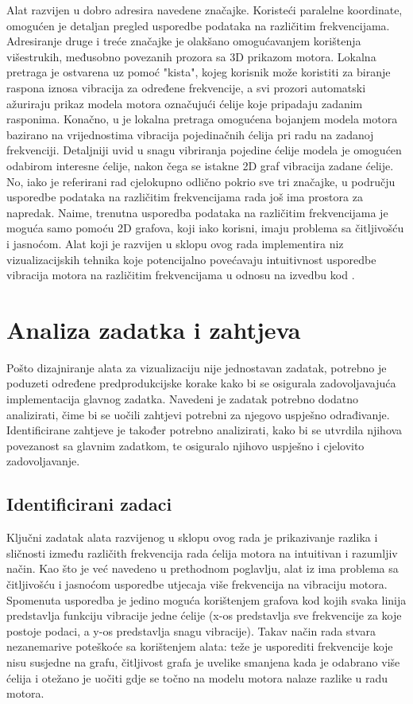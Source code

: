 \documentclass[times, utf8, diplomski]{fer}
\begin{document}
Alat razvijen u \citep{matkovic2021getting} dobro adresira navedene značajke. Koristeći paralelne koordinate, omogućen je detaljan pregled usporedbe podataka na različitim frekvencijama. Adresiranje druge i treće značajke je olakšano omogućavanjem korištenja višestrukih, međusobno povezanih prozora sa 3D prikazom motora. Lokalna pretraga je ostvarena uz pomoć "kista", kojeg korisnik može koristiti za biranje raspona iznosa vibracija za određene frekvencije, a svi prozori automatski ažuriraju prikaz modela motora označujući ćelije koje pripadaju zadanim rasponima. Konačno, u \citep{matkovic2021getting} je lokalna pretraga omogućena bojanjem modela motora bazirano na vrijednostima vibracija pojedinačnih ćelija pri radu na zadanoj frekvenciji. Detaljniji uvid u snagu vibriranja pojedine ćelije modela je omogućen odabirom interesne ćelije, nakon čega se istakne 2D graf vibracija  zadane ćelije.\\

No, iako je referirani rad cjelokupno odlično pokrio sve tri značajke, u području usporedbe podataka na različitim frekvencijama rada još ima prostora za napredak. Naime, trenutna usporedba podataka na različitim frekvencijama je moguća samo pomoću 2D grafova, koji iako korisni, imaju problema sa čitljivošću i jasnoćom. Alat koji je razvijen u sklopu ovog rada implementira niz vizualizacijskih tehnika koje potencijalno povećavaju intuitivnost usporedbe vibracija motora na različitim frekvencijama u odnosu na izvedbu kod \citep{matkovic2021getting}.

\chapter{Analiza zadatka i zahtjeva}
Pošto dizajniranje alata za vizualizaciju nije jednostavan zadatak, potrebno je poduzeti određene predprodukcijske korake kako bi se osigurala zadovoljavajuća implementacija glavnog zadatka. Navedeni je zadatak potrebno dodatno analizirati, čime bi se uočili zahtjevi potrebni za njegovo uspješno odrađivanje. Identificirane zahtjeve je također potrebno analizirati, kako bi se utvrdila njihova povezanost sa glavnim zadatkom, te osiguralo njihovo uspješno i cjelovito zadovoljavanje. 

\section{Identificirani zadaci}
Ključni zadatak alata razvijenog u sklopu ovog rada je prikazivanje razlika i sličnosti između različith frekvencija rada ćelija motora na intuitivan i razumljiv način. Kao što je već navedeno u prethodnom poglavlju, alat iz \citep{matkovic2021getting} ima problema sa čitljivošću i jasnoćom usporedbe utjecaja više frekvencija na vibraciju motora. Spomenuta usporedba je jedino moguća korištenjem grafova kod kojih svaka linija predstavlja funkciju vibracije jedne ćelije (x-os predstavlja sve frekvencije za koje postoje podaci, a y-os predstavlja snagu vibracije). Takav način rada stvara nezanemarive poteškoće sa korištenjem alata: teže je usporediti frekvencije koje nisu susjedne na grafu, čitljivost grafa je uvelike smanjena kada je odabrano više ćelija i otežano je uočiti gdje se točno na modelu motora nalaze razlike u radu motora.
\end{document}
